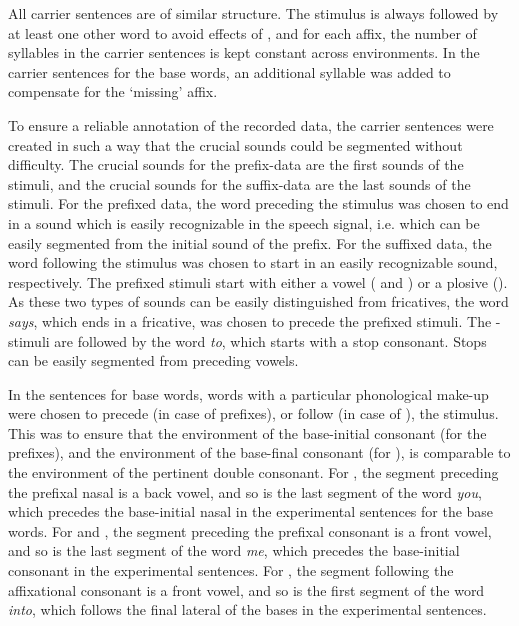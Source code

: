   

All carrier sentences are of similar structure. 
The stimulus is always followed by at least one other word to avoid effects of , and for each affix, the number of syllables in the carrier sentences is kept constant across environments. 
In the carrier sentences for the base words, an additional syllable was added to compensate for the `missing' affix. 


To ensure a reliable annotation of the recorded data, the carrier sentences were created in such a way that the crucial sounds could be segmented without difficulty. The crucial sounds for the prefix-data are the first sounds of the stimuli, and the crucial sounds for the suffix-data are the last sounds of the stimuli. 
For the prefixed data, the word preceding the stimulus was chosen to end in a sound which is easily recognizable in the speech signal, i.e. which can be easily segmented from the initial sound of the prefix. For the suffixed data, the word following the stimulus was chosen to start in an easily recognizable sound, respectively. 
The prefixed stimuli start with either a vowel ( and ) or a plosive (). As these two types of sounds can be easily distinguished from fricatives,   the word \textit{says}, which ends in a fricative, was chosen to precede the prefixed stimuli. 
The -stimuli are followed by the word \textit{to}, which starts with a stop consonant. Stops can be easily segmented from preceding vowels.  


In the sentences for base words, words with a particular phonological make-up were chosen to precede (in case of prefixes), or follow (in case of ), the stimulus. This was to ensure that the environment of the base-initial consonant (for the prefixes), and the environment of the base-final consonant (for ), is comparable to the environment of the pertinent double consonant.
For , the segment preceding the prefixal nasal is a back vowel, and so is the last segment of the word \textit{you}, which precedes the base-initial nasal in the experimental sentences for the base words. 
For  and , the segment preceding the prefixal consonant is a front vowel, and so is the last segment of the word \textit{me}, which precedes the base-initial consonant in the experimental sentences. 
For , the segment following the affixational consonant is a front vowel, and so is the first segment of the word \textit{into}, which follows the final lateral of the bases in the experimental sentences. 




